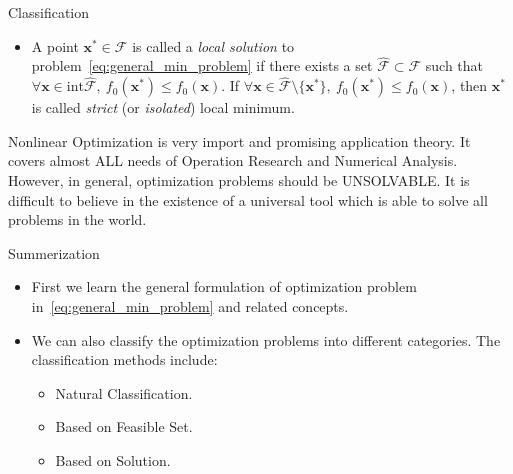 \begin{note}{Classification}
\begin{enumerate}
\begin{itemize}
                \item A point \(\bm{x}^* \in \mathscr{F}\) is called a \emph{local solution} to problem~\ref{eq:general_min_problem} if there exists a set \(\hat{\mathscr{F}} \subset \mathscr{F}\) such that \(\forall \bm{x} \in \mathrm{int}\hat{\mathscr{F}}, ~f_0(\bm{x}^*) \le f_0(\bm{x})\). If \(\forall \bm{x} \in \hat{\mathscr{F}} \setminus \{\bm{{x}^*}\}, ~f_0(\bm{x}^*) \le f_0(\bm{x})\), then \(\bm{x}^*\) is called \emph{strict} (or \emph{isolated}) local minimum.
            \end{itemize}
    \end{enumerate}
\end{note}

Nonlinear Optimization is very import and promising application theory. It covers almost ALL needs of Operation Research and Numerical Analysis. However, in general, optimization problems should be UNSOLVABLE. It is difficult to believe in the existence of a universal tool which is able to solve all problems in the world.

\begin{boxnote}{Summerization}
    \begin{itemize}
        \item First we learn the general formulation of optimization problem in~\ref{eq:general_min_problem} and related concepts.
        \item We can also classify the optimization problems into different categories. The classification methods include:
              \begin{itemize}
                \item Natural Classification.
                \item Based on Feasible Set.
                \item Based on Solution.
              \end{itemize} 
    \end{itemize}
\end{boxnote}

